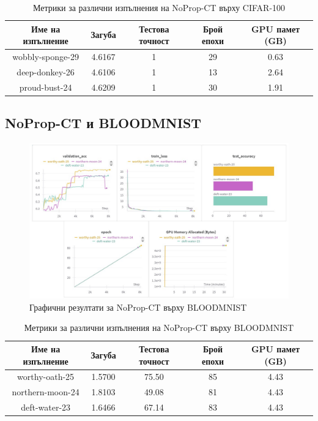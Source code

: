 \documentclass[a4paper,11pt]{article}
\begin{document}
\begin{table}[H]
  \centering
  \renewcommand{\arraystretch}{1.5} %
  \begin{tabular}{ccccc}
    \toprule
    \textbf{Име на изпълнение} & \textbf{Загуба} & \textbf{Тестова точност} & \textbf{Брой епохи} & \textbf{GPU памет (GB)}\\
    \midrule
    wobbly-sponge-29 & 4.6167& 1 & 29 & 0.63 \\
    deep-donkey-26 & 4.6106 & 1 & 13 & 2.64 \\
    proud-bust-24 & 4.6209 & 1 & 30 & 1.91 \\
    \bottomrule
  \end{tabular}
  \caption{Метрики за различни изпълнения на NoProp-CT върху CIFAR-100}
  \label{tab:avg_metrics_noprop_ct_cifar-100}
\end{table}


\subsection{NoProp-CT и BLOODMNIST}
\begin{figure}[H]
    \centering
    \includegraphics[width=6.26in,keepaspectratio]{images/NoProp CT BLOODMNIST.jpg}
    \caption{Графични резултати за NoProp-CT върху BLOODMNIST}
\end{figure}

\begin{table}[H]
  \centering
  \renewcommand{\arraystretch}{1.5} %
  \begin{tabular}{ccccc}
    \toprule
    \textbf{Име на изпълнение} & \textbf{Загуба} & \textbf{Тестова точност} & \textbf{Брой епохи} & \textbf{GPU памет (GB)}\\
    \midrule
    worthy-oath-25 & 1.5700 & 75.50 & 85 & 4.43\\
    northern-moon-24 & 1.8103 & 49.08 & 81 & 4.43\\
    deft-water-23 & 1.6466 & 67.14 & 83 & 4.43\\
    \bottomrule
  \end{tabular}
  \caption{Метрики за различни изпълнения на NoProp-CT върху BLOODMNIST}
  \label{tab:avg_metrics_noprop_ct_bloodmnist}
\end{table}
\end{document}
